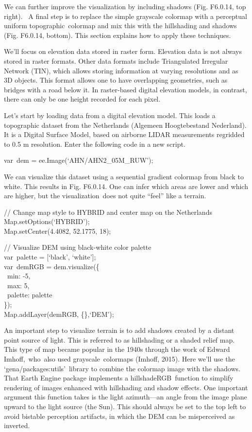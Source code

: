 \documentclass[
  letterpaper,
  DIV=11,
  numbers=noendperiod]{scrreprt}
\begin{document}
We can further improve the visualization by including shadows (Fig.
F6.0.14, top right). ~A final step is to replace the simple grayscale
colormap with a perceptual uniform topographic~colormap and mix this
with the hillshading and shadows (Fig. F6.0.14, bottom). This section
explains how to apply these techniques.

We'll focus on elevation data stored in raster form. Elevation data is
not always stored in raster formats. Other data formats include
Triangulated Irregular Network (TIN), which allows storing information
at varying resolutions and as 3D objects. This format allows one to have
overlapping geometries, such as bridges with a road below it. In
raster-based digital elevation models, in contrast, there can only be
one height recorded for each pixel.

Let's start by loading data from a digital elevation model. This loads a
topographic dataset from the Netherlands (Algemeen Hoogtebestand
Nederland). It is a Digital Surface Model, based on airborne LIDAR
measurements regridded to 0.5 m resolution. Enter the following code in
a new script.

var~dem = ee.Image(`AHN/AHN2\_05M\_RUW');

We can visualize this dataset using a sequential gradient colormap from
black to white. This results in Fig. F6.0.14. One can infer which areas
are lower and which are higher, but the visualization~does not quite
``feel'' like a terrain.

// Change map style to HYBRID and center map on the Netherlands\\
Map.setOptions(`HYBRID');\\
Map.setCenter(4.4082, 52.1775, 18);

// Visualize DEM using black-white color palette\\
var~palette = {[}`black', `white'{]};\\
var~demRGB = dem.visualize(\{\\
\hspace*{0.333em} ~min: -5,\\
\hspace*{0.333em} ~max: 5,\\
\hspace*{0.333em} ~palette: palette\\
\});\\
Map.addLayer(demRGB, \{\},`DEM');

An important step to visualize terrain is to add shadows created by a
distant point source of light. This is referred to as hillshading or a
shaded relief map. This type of map became popular in the 1940s through
the work of Edward Imhoff,~who~also used grayscale~colormaps (Imhoff,
2015). Here we'll use the `gena/packages:utils'~library to combine the
colormap image with the shadows. That Earth Engine package implements a
hillshadeRGB~function to simplify rendering of images enhanced with
hillshading and shadow effects. One important argument this function
takes is the light azimuth---an angle from the image plane upward to the
light source (the Sun). This should always be set to the top left to
avoid bistable perception artifacts, in which the DEM can be
misperceived as inverted.
\end{document}

